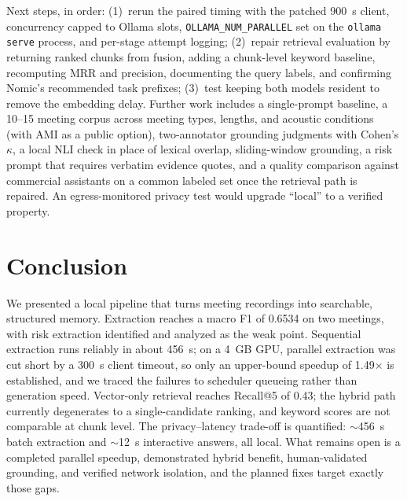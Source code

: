 \documentclass[conference]{IEEEtran}
\begin{document}
Next steps, in order: (1)~rerun the paired timing with the patched 900~s client, concurrency capped to Ollama slots, \texttt{OLLAMA\_NUM\_PARALLEL} set on the \texttt{ollama serve} process, and per-stage attempt logging; (2)~repair retrieval evaluation by returning ranked chunks from fusion, adding a chunk-level keyword baseline, recomputing MRR and precision, documenting the query labels, and confirming Nomic's recommended task prefixes; (3)~test keeping both models resident to remove the embedding delay. Further work includes a single-prompt baseline, a 10--15 meeting corpus across meeting types, lengths, and acoustic conditions (with AMI \cite{ami} as a public option), two-annotator grounding judgments with Cohen's $\kappa$, a local NLI check in place of lexical overlap, sliding-window grounding, a risk prompt that requires verbatim evidence quotes, and a quality comparison against commercial assistants on a common labeled set once the retrieval path is repaired. An egress-monitored privacy test would upgrade ``local'' to a verified property.

\section{Conclusion}
We presented a local pipeline that turns meeting recordings into searchable, structured memory. Extraction reaches a macro F1 of 0.6534 on two meetings, with risk extraction identified and analyzed as the weak point. Sequential extraction runs reliably in about 456~s; on a 4~GB GPU, parallel extraction was cut short by a 300~s client timeout, so only an upper-bound speedup of 1.49$\times$ is established, and we traced the failures to scheduler queueing rather than generation speed. Vector-only retrieval reaches Recall@5 of 0.43; the hybrid path currently degenerates to a single-candidate ranking, and keyword scores are not comparable at chunk level. The privacy--latency trade-off is quantified: $\sim$456~s batch extraction and $\sim$12~s interactive answers, all local. What remains open is a completed parallel speedup, demonstrated hybrid benefit, human-validated grounding, and verified network isolation, and the planned fixes target exactly those gaps.
\end{document}
